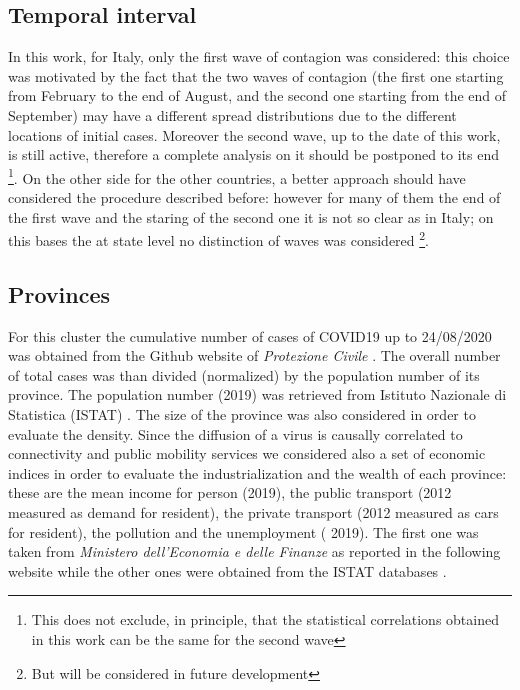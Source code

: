 \documentclass[
12pt, %
a4paper, %
oneside, %
headinclude,footinclude, %
BCOR5mm, %
]{scrartcl}
\begin{document}
\subsection{Temporal interval}

In this work, for Italy, only the first wave of contagion was considered: this choice was motivated by the fact that the two waves of contagion (the first one starting from February to the end of August, and the second one starting from the end of September) may have a different spread distributions due to the different locations of initial cases. Moreover the second wave, up to the date of this work, is still active, therefore a complete analysis on it should be postponed to its end \footnote{This does not exclude, in principle, that the statistical correlations obtained in this work can be the same for the second wave}. On the other side for the other countries, a better approach should have considered the procedure described before: however for many of them the end of the first wave and the staring of the second one it is not so clear as in Italy; on this bases the at state level no distinction of waves was considered \footnote{But will be considered in future development}.   


\subsection{Provinces} 
For this cluster the cumulative number of cases of COVID19 up to 24/08/2020 was obtained from the Github website of \textit{Protezione Civile} \cite{github-protezionecivile} . The overall number of total cases was than divided (normalized) by the population number of its province. The population number (2019) was retrieved from Istituto Nazionale di Statistica (ISTAT) \cite{ISTAT}. The size of the province was also considered in order to evaluate the density. Since the diffusion of a virus is causally correlated to connectivity and public mobility services \cite{lloyd2001viruses,kraemer2020effect} we considered also a set of economic indices in order to evaluate the industrialization and the wealth of each province: these are the mean income for person (2019), the public transport (2012 measured as demand for resident), the private transport (2012 measured as cars for resident), the pollution and the unemployment ( 2019). The first one was taken from \textit{Ministero dell'Economia e delle Finanze} as reported in the following website \cite{MEF} while the other ones were obtained from the ISTAT databases \cite{ISTAT}.
\end{document}
